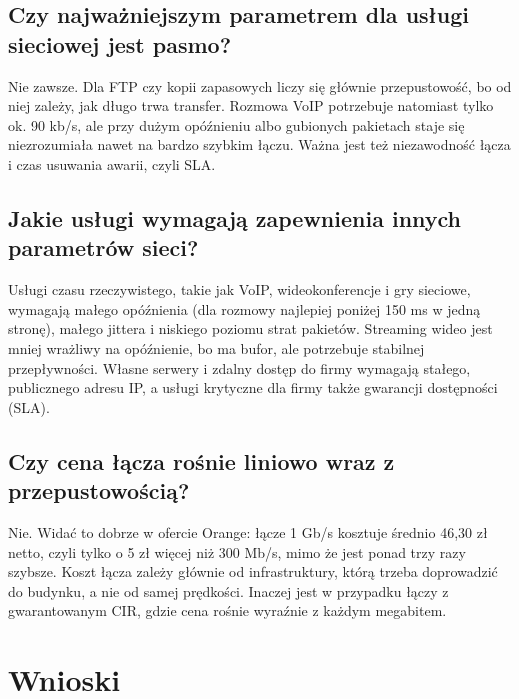 \documentclass[12pt,a4paper]{article}
\begin{document}
\subsection{Czy najważniejszym parametrem dla usługi sieciowej jest pasmo?}

Nie zawsze. Dla FTP czy kopii zapasowych liczy się głównie przepustowość, bo od niej zależy, jak
długo trwa transfer. Rozmowa VoIP potrzebuje natomiast tylko ok. 90 kb/s, ale przy dużym
opóźnieniu albo gubionych pakietach staje się niezrozumiała nawet na bardzo szybkim łączu.
Ważna jest też niezawodność łącza i czas usuwania awarii, czyli SLA.

\subsection{Jakie usługi wymagają zapewnienia innych parametrów sieci?}

Usługi czasu rzeczywistego, takie jak VoIP, wideokonferencje i gry sieciowe, wymagają małego
opóźnienia (dla rozmowy najlepiej poniżej 150 ms w jedną stronę), małego jittera i niskiego
poziomu strat pakietów. Streaming wideo jest mniej wrażliwy na opóźnienie, bo ma bufor,
ale potrzebuje stabilnej przepływności. Własne serwery i zdalny dostęp do firmy wymagają
stałego, publicznego adresu IP, a usługi krytyczne dla firmy także gwarancji dostępności (SLA).

\subsection{Czy cena łącza rośnie liniowo wraz z przepustowością?}

Nie. Widać to dobrze w ofercie Orange: łącze 1 Gb/s kosztuje średnio 46,30 zł netto, czyli tylko
o 5 zł więcej niż 300 Mb/s, mimo że jest ponad trzy razy szybsze. Koszt łącza zależy głównie od
infrastruktury, którą trzeba doprowadzić do budynku, a nie od samej prędkości. Inaczej jest
w przypadku łączy z gwarantowanym CIR, gdzie cena rośnie wyraźnie z każdym megabitem.

\section{Wnioski}
\end{document}
